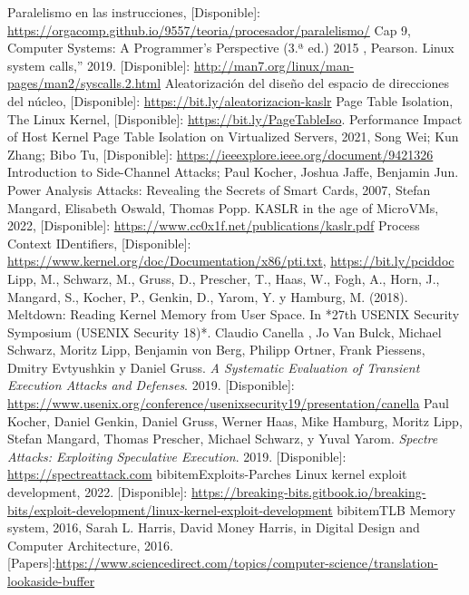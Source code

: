 \documentclass[lettersize,compsoc]{IEEEtran}
\begin{document}
\begin{thebibliography}{9}


 Paralelismo en las instrucciones, [Disponible]: \url{https://orgacomp.github.io/9557/teoria/procesador/paralelismo/}
 Cap 9, Computer Systems: A Programmer’s Perspective (3.ª ed.) 2015 , Pearson.
  Linux system calls,” 2019. [Disponible]: \url{http://man7.org/linux/man-pages/man2/syscalls.2.html} 
 Aleatorización del diseño del espacio de direcciones del núcleo, [Disponible]: \url{https://bit.ly/aleatorizacion-kaslr}
 Page Table Isolation, The Linux Kernel, [Disponible]: \url{https://bit.ly/PageTableIso}.
 Performance Impact of Host Kernel Page Table Isolation on Virtualized Servers, 2021, Song Wei; Kun Zhang; Bibo Tu, [Disponible]: \url{https://ieeexplore.ieee.org/document/9421326}
 Introduction to Side-Channel Attacks; Paul Kocher, Joshua Jaffe, Benjamin Jun.
 Power Analysis Attacks: Revealing the Secrets of Smart Cards, 2007,  Stefan Mangard, Elisabeth Oswald, Thomas Popp.
 KASLR in the age of MicroVMs, 2022, [Disponible]: \url{https://www.cc0x1f.net/publications/kaslr.pdf}
 Process Context IDentifiers, [Disponible]: \url{https://www.kernel.org/doc/Documentation/x86/pti.txt}, \url{https://bit.ly/pciddoc}
 Lipp, M., Schwarz, M., Gruss, D., Prescher, T., Haas, W., Fogh, A., Horn, J., Mangard, S., Kocher, P., Genkin, D., Yarom, Y. y Hamburg, M. (2018). Meltdown: Reading Kernel Memory from User Space. In *27th USENIX Security Symposium (USENIX Security 18)*.
 Claudio Canella , Jo Van Bulck, Michael Schwarz, Moritz Lipp, Benjamin von Berg, Philipp Ortner, Frank Piessens, Dmitry Evtyushkin y Daniel Gruss. \textit{A Systematic Evaluation of Transient Execution Attacks and Defenses}. 2019. [Disponible]: \url{https://www.usenix.org/conference/usenixsecurity19/presentation/canella}
 Paul Kocher, Daniel Genkin, Daniel Gruss, Werner Haas, Mike Hamburg, Moritz Lipp, Stefan Mangard, Thomas Prescher, Michael Schwarz, y Yuval Yarom. \textit{Spectre Attacks: Exploiting Speculative Execution}. 2019. [Disponible]: \url{https://spectreattack.com}
bibitem{Exploits-Parches} Linux kernel exploit development, 2022. [Disponible]: \url{https://breaking-bits.gitbook.io/breaking-bits/exploit-development/linux-kernel-exploit-development}
bibitem{TLB} Memory system, 2016, Sarah L. Harris, David Money Harris, in Digital Design and Computer Architecture, 2016. [Papers]:\url{https://www.sciencedirect.com/topics/computer-science/translation-lookaside-buffer}

\end{thebibliography}
\end{document}
